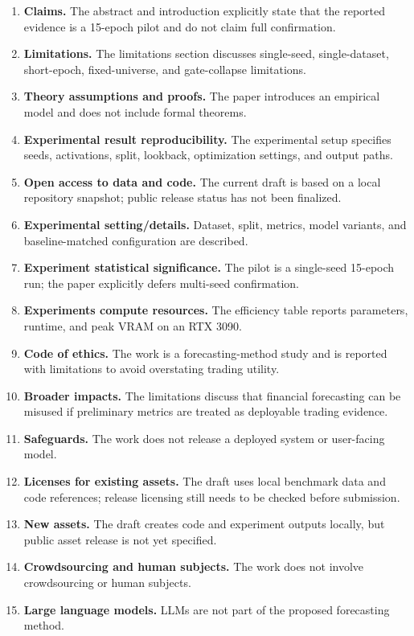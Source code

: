 \documentclass{article}
\begin{document}
\begin{enumerate}
\item {\bf Claims.} \answerYes{} The abstract and introduction explicitly state that the reported evidence is a 15-epoch pilot and do not claim full confirmation.
\item {\bf Limitations.} \answerYes{} The limitations section discusses single-seed, single-dataset, short-epoch, fixed-universe, and gate-collapse limitations.
\item {\bf Theory assumptions and proofs.} \answerNA{} The paper introduces an empirical model and does not include formal theorems.
\item {\bf Experimental result reproducibility.} \answerYes{} The experimental setup specifies seeds, activations, split, lookback, optimization settings, and output paths.
\item {\bf Open access to data and code.} \answerNo{} The current draft is based on a local repository snapshot; public release status has not been finalized.
\item {\bf Experimental setting/details.} \answerYes{} Dataset, split, metrics, model variants, and baseline-matched configuration are described.
\item {\bf Experiment statistical significance.} \answerNo{} The pilot is a single-seed 15-epoch run; the paper explicitly defers multi-seed confirmation.
\item {\bf Experiments compute resources.} \answerYes{} The efficiency table reports parameters, runtime, and peak VRAM on an RTX 3090.
\item {\bf Code of ethics.} \answerYes{} The work is a forecasting-method study and is reported with limitations to avoid overstating trading utility.
\item {\bf Broader impacts.} \answerYes{} The limitations discuss that financial forecasting can be misused if preliminary metrics are treated as deployable trading evidence.
\item {\bf Safeguards.} \answerNA{} The work does not release a deployed system or user-facing model.
\item {\bf Licenses for existing assets.} \answerNA{} The draft uses local benchmark data and code references; release licensing still needs to be checked before submission.
\item {\bf New assets.} \answerNo{} The draft creates code and experiment outputs locally, but public asset release is not yet specified.
\item {\bf Crowdsourcing and human subjects.} \answerNA{} The work does not involve crowdsourcing or human subjects.
\item {\bf Large language models.} \answerNA{} LLMs are not part of the proposed forecasting method.
\end{enumerate}
\end{document}
